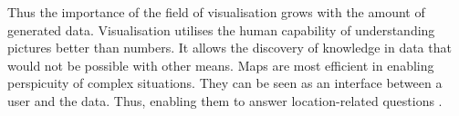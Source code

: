 Thus the importance of the field of visualisation grows with the amount of generated data. Visualisation utilises the human capability of understanding pictures better than numbers. It allows the discovery of knowledge in data that would not be possible with other means. Maps are most efficient in enabling perspicuity of complex situations. They can be seen as an interface between a user and the data. Thus, enabling them to answer location-related questions .